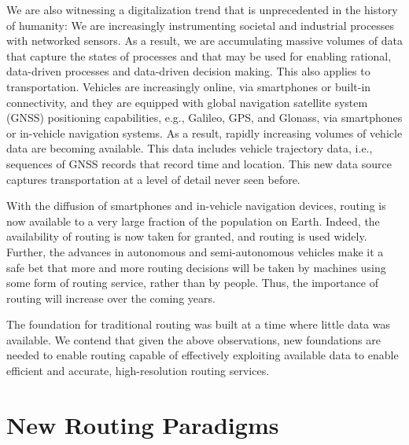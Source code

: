 \documentclass[11pt]{article}
\begin{document}
We are also witnessing a digitalization trend that is unprecedented in the history of humanity: We are increasingly instrumenting societal and industrial processes with networked sensors. As a result, we are accumulating massive volumes of data that capture the states of processes and that may be used for enabling rational, data-driven processes and data-driven decision making. This also applies to transportation. Vehicles are increasingly online, via smartphones or built-in connectivity, and they are equipped with global navigation satellite system (GNSS) positioning capabilities, e.g., Galileo, GPS, and Glonass, via smartphones or in-vehicle navigation systems. As a result, rapidly increasing volumes of vehicle data are becoming available. This data includes vehicle trajectory data, i.e., sequences of GNSS records that record time and location. This new data source captures transportation at a level of detail never seen before.

With the diffusion of smartphones and in-vehicle navigation devices, routing is now available to a very large fraction of the population on Earth. Indeed, the availability of routing is now taken for granted, and routing is used widely. Further, the advances in autonomous and semi-autonomous vehicles make it a safe bet that more and more routing decisions will be taken by machines using some form of routing service, rather than by people. Thus, the importance of routing will increase over the coming years.

The foundation for traditional routing was built at a time where little data was available. We contend that given the above observations, new foundations are needed to enable routing capable of effectively exploiting available data to enable efficient and accurate, high-resolution routing services.


\section{New Routing Paradigms}
\end{document}
